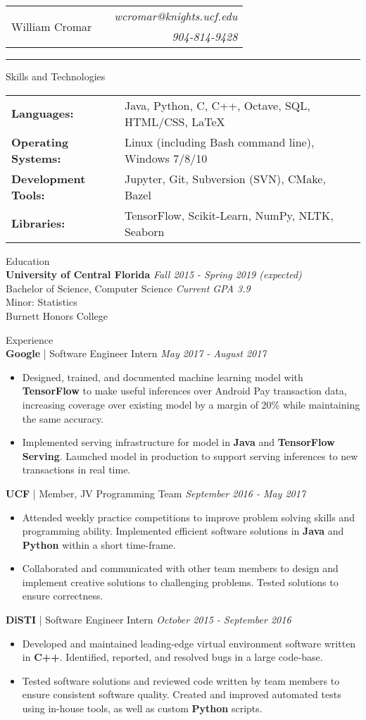 \documentclass[letterpaper,11pt,oneside]{article}
\newcommand{\mkheader}[3]{
  {\fontfamily{pag}\selectfont
  \begin{tabularx}{\textwidth}{lXr}
    \multirow{2}{*}{\Huge #1} && \emph{#2}
    \\ && \emph{#3}
  \end{tabularx}
  }
  \vspace{2pt}
  \hrule
}
\newcommand{\resheader}[2][]{
  \vspace{9pt}
  {\LARGE #2} #1
  \\
}
\newcommand{\ressubheader}[3][]{
  \vspace{6pt}
  {\large \textbf{#2} #1} \hfill \emph{#3}
  \\
}
\newcommand{\resskill}[1]{\textbf{#1}}
\begin{document}
\mkheader{William Cromar}{wcromar@knights.ucf.edu}{904-814-9428}

\resheader{Skills and Technologies}
\vspace{6pt}
\begin{tabular}{>{\bfseries}l@{\hskip .25cm} l}
  Languages: & Java, Python, C, C++, Octave, SQL, HTML/CSS, LaTeX \\
  Operating Systems: & Linux (including Bash command line), Windows 7/8/10 \\
  Development Tools: & Jupyter, Git, Subversion (SVN), CMake, Bazel \\
  Libraries: & TensorFlow, Scikit-Learn, NumPy, NLTK, Seaborn
\end{tabular}


\resheader{Education}
\ressubheader{University of Central Florida}{Fall 2015 - Spring 2019 (expected)}
Bachelor of Science, Computer Science \hfill \emph{Current GPA 3.9} \\
Minor: Statistics \\
Burnett Honors College

\resheader{Experience}
\ressubheader[| Software Engineer Intern]{Google}{May 2017 - August 2017}
\begin{itemize}
  \item Designed, trained, and documented machine learning model with \resskill{TensorFlow} to make useful inferences over Android Pay transaction data, increasing coverage over existing model by a margin of 20\% while maintaining the same accuracy.
  \item Implemented serving infrastructure for model in \resskill{Java} and \resskill{TensorFlow Serving}. Launched model in production to support serving inferences to new transactions in real time.
\end{itemize}

\ressubheader[| Member, JV Programming Team]{UCF}{September 2016 - May 2017}
\begin{itemize}
  \item Attended weekly practice competitions to improve problem solving skills and programming ability. Implemented efficient software solutions in \resskill{Java} and \resskill{Python} within a short time-frame. 
  \item Collaborated and communicated with other team members to design and implement creative solutions to challenging problems. Tested solutions to ensure correctness.
\end{itemize}

\ressubheader[| Software Engineer Intern]{DiSTI}{October 2015 - September 2016}
\begin{itemize}
  \item Developed and maintained leading-edge virtual environment software written in \resskill{C++}. Identified, reported, and resolved bugs in a large code-base.
  \item Tested software solutions and reviewed code written by team members to ensure consistent software quality. Created and improved automated tests using in-house tools, as well as custom \resskill{Python} scripts.
\end{itemize}
\end{document}
